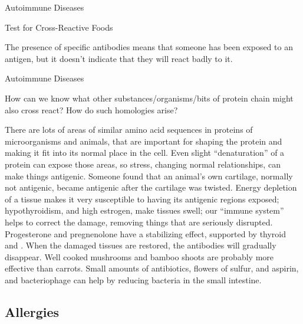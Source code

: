 \documentclass[11pt,oneside,openany,extrafontsizes]{memoir}
\begin{document}
\begin{standalonequote}{Autoimmune Diseases}
    \begin{note}
        Test for Cross-Reactive Foods
    \end{note}

    \begin{answer}
        The presence of specific antibodies means that someone has been exposed to an antigen, but it doesn't indicate that they will react badly to it.
    \end{answer}
\end{standalonequote}

\begin{qaexchange}{Autoimmune Diseases}

    \begin{question}
         How can we know what other substances/organisms/bits of protein chain might also cross react? How do such homologies arise?
    \end{question}

    \begin{answer}
      There are lots of areas of similar amino acid sequences in proteins of microorganisms and animals, that are important for shaping the protein and making it fit into its normal place in the cell. Even slight \enquote{denaturation} of a protein can expose those areas, so stress, changing normal relationships, can make things antigenic. Someone found that an animal's own cartilage, normally not antigenic, became antigenic after the cartilage was twisted. Energy depletion of a tissue makes it very susceptible to having its antigenic regions exposed; hypothyroidism, and high estrogen, make tissues swell; our \enquote{immune system} helps to correct the damage, removing things that are seriously disrupted. Progesterone and pregnenolone have a stabilizing effect, supported by thyroid and . When the damaged tissues are restored, the antibodies will gradually disappear. Well cooked mushrooms and bamboo shoots are probably more effective than carrots. Small amounts of antibiotics, flowers of sulfur, and aspirin, and bacteriophage can help by reducing bacteria in the small intestine.
    \end{answer}
\end{qaexchange}

\subsection{Allergies}
\end{document}
